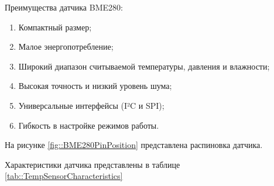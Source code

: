 Преимущества датчика BME280:

\begin{enumerate}

    \item Компактный размер;
	
    \item Малое энергопотребление;
	
    \item Широкий диапазон считываемой температуры, давления и влажности;
    
    \item Высокая точность и низкий уровень шума;
 
    \item Универсальные интерфейсы (I²C и SPI);
    
    \item Гибкость в настройке режимов работы.
    
\end{enumerate}

На рисунке \ref{fig::BME280PinPosition} представлена распиновка датчика.


Характеристики датчика представлены в таблице \ref{tab::TempSensorCharacteristics}